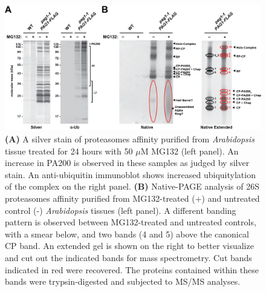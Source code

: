 \begin{figure}
	\centering
	\includegraphics[width=\columnwidth]{Proteasome/mg132split1.png}
	{\textbf{(A)} A silver stain of proteasomes affinity purified from \textit{Arabidopsis} tissue treated for 24 hours with 50 $\mu$M MG132 (left panel). An increase in PA200 is observed in these samples as judged by silver stain. An anti-ubiquitin immunoblot shows increased ubiquitylation of the complex on the right panel. \textbf{(B)} Native-PAGE analysis of 26S proteasomes affinity purified from MG132-treated (+) and untreated control (-) \textit{Arabidopsis} tissues (left panel). A different banding pattern is observed between MG132-treated and untreated controls, with a smear below, and two bands (4 and 5) above the canonical CP band. An extended gel is shown on the right to better visualize and cut out the indicated bands for mass spectrometry. Cut bands indicated in red were recovered. The proteins contained within these bands were trypsin-digested and subjected to MS/MS analyses.}
	\label{fig:mg132split1}
\end{figure}

